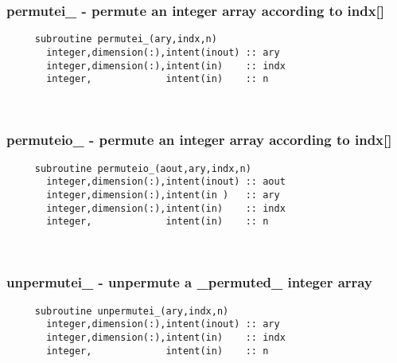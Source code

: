   \subsubsection{permutei\_ - permute an integer array according to indx[]}

\begin{verbatim} 
     subroutine permutei_(ary,indx,n)
       integer,dimension(:),intent(inout) :: ary
       integer,dimension(:),intent(in)    :: indx
       integer,             intent(in)    :: n
 \end{verbatim}%
% 
 
\mbox{}\hrulefill\ 
 

  \subsubsection{permuteio\_ - permute an integer array according to indx[]}

\begin{verbatim} 
     subroutine permuteio_(aout,ary,indx,n)
       integer,dimension(:),intent(inout) :: aout
       integer,dimension(:),intent(in )   :: ary
       integer,dimension(:),intent(in)    :: indx
       integer,             intent(in)    :: n
 \end{verbatim}%
 
 
\mbox{}\hrulefill\ 
 

  \subsubsection{unpermutei\_ - unpermute a \_permuted\_ integer array}

\begin{verbatim} 
     subroutine unpermutei_(ary,indx,n)
       integer,dimension(:),intent(inout) :: ary
       integer,dimension(:),intent(in)    :: indx
       integer,             intent(in)    :: n
 \end{verbatim}%
 
